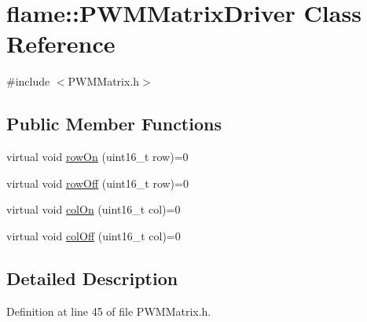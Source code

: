 \hypertarget{classflame_1_1_p_w_m_matrix_driver}{\section{flame\-:\-:P\-W\-M\-Matrix\-Driver Class Reference}
\label{classflame_1_1_p_w_m_matrix_driver}
}


{\ttfamily \#include $<$P\-W\-M\-Matrix.\-h$>$}

\subsection*{Public Member Functions}
\begin{DoxyCompactItemize}
\item 
virtual void \hyperlink{classflame_1_1_p_w_m_matrix_driver_af1980c3709f6298a4907f24e1bf1c1a2}{row\-On} (uint16\-\_\-t row)=0
\item 
virtual void \hyperlink{classflame_1_1_p_w_m_matrix_driver_a5d8e0f3af8288cfbc744c625273c4a3b}{row\-Off} (uint16\-\_\-t row)=0
\item 
virtual void \hyperlink{classflame_1_1_p_w_m_matrix_driver_a8abc10703f2e22be9c8a68f80f99f4fc}{col\-On} (uint16\-\_\-t col)=0
\item 
virtual void \hyperlink{classflame_1_1_p_w_m_matrix_driver_ab22d1d01a34416f934157607dd09bea8}{col\-Off} (uint16\-\_\-t col)=0
\end{DoxyCompactItemize}


\subsection{Detailed Description}


Definition at line 45 of file P\-W\-M\-Matrix.\-h.



